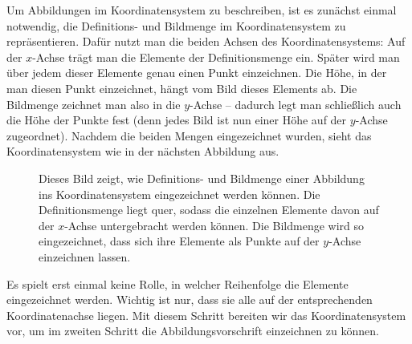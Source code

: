 \documentclass[../../main.tex]{subfiles}
\begin{document}
Um Abbildungen im Koordinatensystem zu beschreiben, ist es zunächst einmal notwendig, die Definitions- und Bildmenge im Koordinatensystem zu repräsentieren. Dafür nutzt man die beiden Achsen des Koordinatensystems: Auf der $x$-Achse trägt man die Elemente der Definitionsmenge ein. Später wird man über jedem dieser Elemente genau einen Punkt einzeichnen. Die Höhe, in der man diesen Punkt einzeichnet, hängt vom Bild dieses Elements ab. Die Bildmenge zeichnet man also in die $y$-Achse -- dadurch legt man schließlich auch die Höhe der Punkte fest (denn jedes Bild ist nun einer Höhe auf der $y$-Achse zugeordnet). Nachdem die beiden Mengen eingezeichnet wurden, sieht das Koordinatensystem wie in der nächsten Abbildung aus.

\begin{figure}[ht]
    \centering
    \caption{Dieses Bild zeigt, wie Definitions- und Bildmenge einer Abbildung ins Koordinatensystem eingezeichnet werden können. Die Definitionsmenge liegt quer, sodass die einzelnen Elemente davon auf der $x$-Achse untergebracht werden können. Die Bildmenge wird so eingezeichnet, dass sich ihre Elemente als Punkte auf der $y$-Achse einzeichnen lassen.}
\end{figure}

Es spielt erst einmal keine Rolle, in welcher Reihenfolge die Elemente eingezeichnet werden. Wichtig ist nur, dass sie alle auf der entsprechenden Koordinatenachse liegen. Mit diesem Schritt bereiten wir das Koordinatensystem vor, um im zweiten Schritt die Abbildungsvorschrift einzeichnen zu können.
\end{document}

